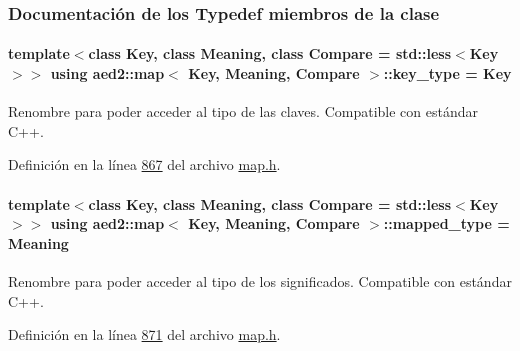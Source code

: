 \subsubsection{Documentación de los \textquotesingle{}Typedef\textquotesingle{} miembros de la clase}
\paragraph[{\texorpdfstring{key\+\_\+type}{key_type}}]{\setlength{\rightskip}{0pt plus 5cm}template$<$class Key, class Meaning, class Compare = std\+::less$<$\+Key$>$$>$ using {\bf aed2\+::map}$<$ Key, Meaning, Compare $>$\+::{\bf key\+\_\+type} =  Key}\hypertarget{classaed2_1_1map_a4273e8812e7105a618df58a2c8b72b7d_a4273e8812e7105a618df58a2c8b72b7d}{}\label{classaed2_1_1map_a4273e8812e7105a618df58a2c8b72b7d_a4273e8812e7105a618df58a2c8b72b7d}


Renombre para poder acceder al tipo de las claves. Compatible con estándar C++. 



Definición en la línea \hyperlink{map_8h_source_l00867}{867} del archivo \hyperlink{map_8h_source}{map.\+h}.

\paragraph[{\texorpdfstring{mapped\+\_\+type}{mapped_type}}]{\setlength{\rightskip}{0pt plus 5cm}template$<$class Key, class Meaning, class Compare = std\+::less$<$\+Key$>$$>$ using {\bf aed2\+::map}$<$ Key, Meaning, Compare $>$\+::{\bf mapped\+\_\+type} =  Meaning}\hypertarget{classaed2_1_1map_aa3e34bf624f3009884a71b18f4ddae40_aa3e34bf624f3009884a71b18f4ddae40}{}\label{classaed2_1_1map_aa3e34bf624f3009884a71b18f4ddae40_aa3e34bf624f3009884a71b18f4ddae40}


Renombre para poder acceder al tipo de los significados. Compatible con estándar C++. 



Definición en la línea \hyperlink{map_8h_source_l00871}{871} del archivo \hyperlink{map_8h_source}{map.\+h}.

